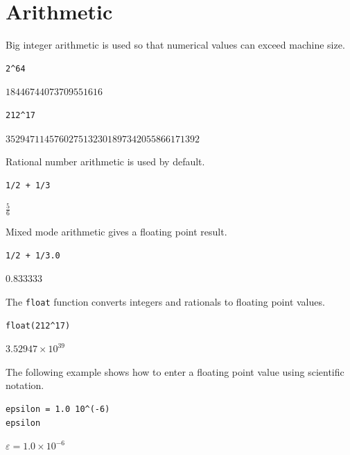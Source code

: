 
\newpage

\section{Arithmetic}

Big integer arithmetic is used so that numerical values can
exceed machine size.

{\color{blue}
\begin{verbatim}
2^64
\end{verbatim}
}

$\displaystyle 18446744073709551616$

{\color{blue}
\begin{verbatim}
212^17
\end{verbatim}
}

$\displaystyle 3529471145760275132301897342055866171392$

\bigskip
Rational number arithmetic is used by default.

{\color{blue}
\begin{verbatim}
1/2 + 1/3
\end{verbatim}
}

$\displaystyle \tfrac{5}{6}$

\bigskip
Mixed mode arithmetic gives a floating point result.

{\color{blue}
\begin{verbatim}
1/2 + 1/3.0
\end{verbatim}
}

$\displaystyle 0.833333$

\bigskip
The \verb$float$ function converts integers and rationals to floating point values.

{\color{blue}
\begin{verbatim}
float(212^17)
\end{verbatim}
}

$\displaystyle 3.52947\times10^{39}$

\bigskip
The following example shows how to enter a floating point value
using scientific notation.

{\color{blue}
\begin{verbatim}
epsilon = 1.0 10^(-6)
epsilon
\end{verbatim}
}

$\displaystyle \varepsilon=1.0\times10^{-6}$



